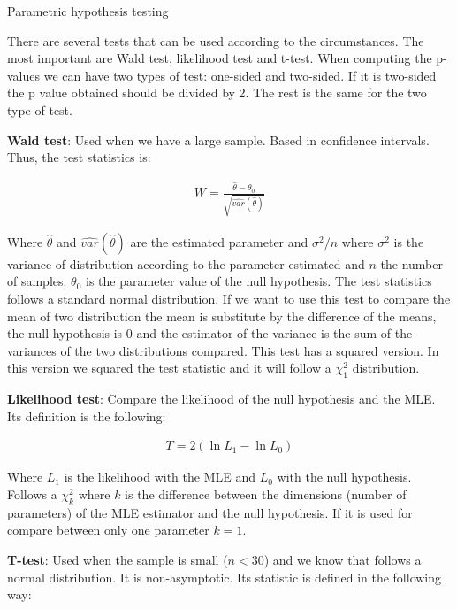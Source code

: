 \documentclass{beamer}
\begin{document}
\begin{columns}
\begin{column}{0.3\textwidth}

\begin{block}{Parametric hypothesis testing}

There are several tests that can be used according to the circumstances. The most important are Wald test, likelihood test and t-test. When computing the p-values we can have two types of test: one-sided and two-sided. If it is two-sided the p value obtained should be divided by 2. The rest is the same for the two type of test.

\textbf{Wald test}: Used when we have a large sample. Based in confidence intervals. Thus, the test statistics is:

\begin{align*}
    W = \frac{\hat{\theta} - \theta_0}{\sqrt{\hat{var}(\hat{\theta})}}
\end{align*}

Where $\hat{\theta}$ and $\hat{var}(\hat{\theta})$ are the estimated parameter and $\sigma^2/n$ where $\sigma^2$ is the variance of distribution according to the parameter estimated and $n$ the number of samples. $\theta_0$ is the parameter value of the null hypothesis. The test statistics follows a standard normal distribution. If we want to use this test to compare the mean of two distribution the mean is substitute by the difference of the means, the null hypothesis is 0 and the estimator of the variance is the sum of the variances of the two distributions compared. This test has a squared version. In this version we squared the test statistic and it will follow a $\chi^2_1$ distribution.
\newline

\textbf{Likelihood test}: Compare the likelihood of the null hypothesis and the MLE. Its definition is the following:

\begin{align*}
    T = 2(\ln{L_1} - \ln{L_0})
\end{align*}

Where $L_1$ is the likelihood with the MLE and $L_0$ with the null hypothesis. Follows a $\chi^2_k$ where $k$ is the difference between the dimensions (number of parameters) of the MLE estimator and the null hypothesis. If it is used for compare between only one parameter $k=1$.
\newline

\textbf{T-test}: Used when the sample is small ($n < 30$) and we know that follows a normal distribution. It is non-asymptotic. Its statistic is defined in the following way:


\end{block}
\end{column}
\end{columns}
\end{document}

